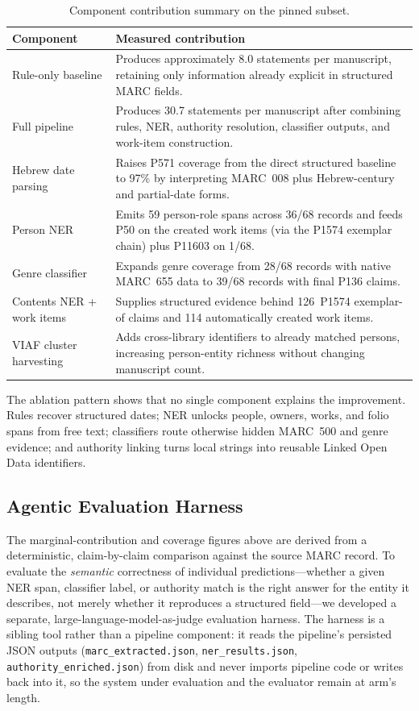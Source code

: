 \documentclass[Afour,sageh,times]{sagej}
\begin{document}
\begin{table}[t]
\caption{Component contribution summary on the pinned subset.}
\label{tab:ablation}
\centering
\small
\begin{tabularx}{\linewidth}{p{3.4cm}X}
\toprule
\textbf{Component} & \textbf{Measured contribution} \\
\midrule
Rule-only baseline & Produces approximately 8.0 statements per manuscript, retaining only information already explicit in structured MARC fields. \\
Full pipeline & Produces 30.7 statements per manuscript after combining rules, NER, authority resolution, classifier outputs, and work-item construction. \\
Hebrew date parsing & Raises P571 coverage from the direct structured baseline to 97\% by interpreting MARC~008 plus Hebrew-century and partial-date forms. \\
Person NER & Emits 59 person-role spans across 36/68 records and feeds P50 on the created work items (via the P1574 exemplar chain) plus P11603 on 1/68. \\
Genre classifier & Expands genre coverage from 28/68 records with native MARC~655 data to 39/68 records with final P136 claims. \\
Contents NER + work items & Supplies structured evidence behind 126~P1574 exemplar-of claims and 114 automatically created work items. \\
VIAF cluster harvesting & Adds cross-library identifiers to already matched persons, increasing person-entity richness without changing manuscript count. \\
\bottomrule
\end{tabularx}
\end{table}

The ablation pattern shows that no single component explains the improvement. Rules recover structured dates; NER unlocks people, owners, works, and folio spans from free text; classifiers route otherwise hidden MARC~500 and genre evidence; and authority linking turns local strings into reusable Linked Open Data identifiers.

\subsection{Agentic Evaluation Harness}
\label{sec:eval-harness}

The marginal-contribution and coverage figures above are derived from a deterministic, claim-by-claim comparison against the source MARC record. To evaluate the \emph{semantic} correctness of individual predictions---whether a given NER span, classifier label, or authority match is the right answer for the entity it describes, not merely whether it reproduces a structured field---we developed a separate, large-language-model-as-judge evaluation harness. The harness is a sibling tool rather than a pipeline component: it reads the pipeline's persisted JSON outputs (\texttt{marc\_extracted.json}, \texttt{ner\_results.json}, \texttt{authority\_enriched.json}) from disk and never imports pipeline code or writes back into it, so the system under evaluation and the evaluator remain at arm's length.
\end{document}
